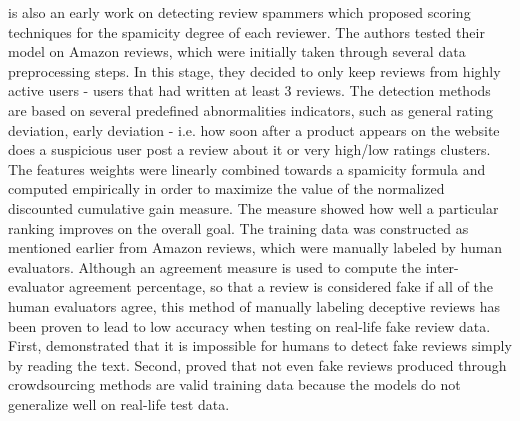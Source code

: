 \citet{Lim2010} is also an early work on detecting review spammers which proposed scoring techniques for the spamicity degree of each reviewer. The authors tested their model on Amazon reviews, which were initially taken through several data preprocessing steps. In this stage, they decided to only keep reviews from highly active users - users that had written at least 3 reviews. The detection methods are based on several predefined abnormalities indicators, such as general rating deviation, early deviation - i.e. how soon after a product appears on the website does a suspicious user post a review about it or very high/low ratings clusters. The features weights were linearly combined towards a spamicity formula and computed empirically in order to maximize the value of the normalized discounted cumulative gain measure. The measure showed how well a particular ranking improves on the overall goal. The training data was constructed as mentioned earlier from Amazon reviews, which were manually labeled by human evaluators. Although an agreement measure is used to compute the inter-evaluator agreement percentage, so that a review is considered fake if all of the human evaluators agree, this method of manually labeling deceptive reviews has been proven to lead to low accuracy when testing on real-life fake review data. 
First, \citet{Ott2011} demonstrated that it is impossible for humans to detect fake reviews simply by reading the text. Second, \citet{Mukherjee2012} proved that not even fake reviews produced through crowdsourcing methods are valid training data because the models do not generalize well on real-life test data.

